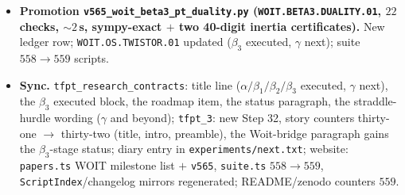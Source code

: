 \documentclass[11pt]{article}
\begin{document}
\begin{itemize}[leftmargin=1.5em]
--- the mirror whose descent \texttt{v524} certified: $\Theta_{\mathrm{phys}}$ is the
quotient shadow of the duality (regressions re-verified: Gram PD $(16,0,0)$, anti-unitary
with $\eta_\perp=+i$, $\Theta^2=+1$ per sector, time reversal, torsor closure). Role
separation complete: $\sigma_{\mathrm{std}}\sim$ the OS cut (the metric), the $\Phi$-twisted
duality $\sim$ the descending mirror. Free/quotient level only; $\mathcal A_{\mathrm{hol}}$
untouched; all seven kill tests stay live; no marker moves.
\item \textbf{Promotion \texttt{v565\_woit\_beta3\_pt\_duality.py}
(\texttt{WOIT.BETA3.DUALITY.01}, $22$ checks, ${\sim}2$\,s, sympy-exact $+$ two 40-digit
inertia certificates).} New ledger row; \texttt{WOIT.OS.TWISTOR.01} updated ($\beta_3$
executed, $\gamma$ next); suite $558\to559$ scripts.
\item \textbf{Sync.} \texttt{tfpt\_research\_contracts}: title line
($\alpha/\beta_1/\beta_2/\beta_3$ executed, $\gamma$ next), the $\beta_3$ executed block, the
roadmap item, the status paragraph, the straddle-hurdle wording ($\gamma$ and beyond);
\texttt{tfpt\_3}: new Step 32, story counters thirty-one $\to$ thirty-two (title, intro,
preamble), the Woit-bridge paragraph gains the $\beta_3$-stage status; diary entry in
\texttt{experiments/next.txt}; website: \texttt{papers.ts} WOIT milestone list $+$
\texttt{v565}, \texttt{suite.ts} $558\to559$, \texttt{ScriptIndex}/changelog mirrors
regenerated; README/zenodo counters $559$.
\end{itemize}
\end{document}
